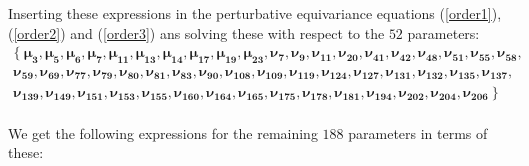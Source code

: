 \documentclass[a4paper,12pt, DIV=14, BCOR=5mm, twoside, headsepline, numbers=noenddot]{scrbook}
\begin{document}
\vspace{1cm}

Inserting these expressions in the perturbative equivariance equations (\ref{order1}), (\ref{order2}) and (\ref{order3}) ans solving these with respect to the $52$ parameters:\\

\begin{multline}\label{AreaParas}
\bigl\{ \ 
\boldsymbol{\mu_{3}},\boldsymbol{\mu_{5}},\boldsymbol{\mu_{6}},\boldsymbol{\mu_{7}},\boldsymbol{\mu_{11}},\boldsymbol{\mu_{13}},\boldsymbol{\mu_{14}},\boldsymbol{\mu_{17}},\boldsymbol{\mu_{19}},\boldsymbol{\mu_{23}},\boldsymbol{\nu_{7}},\boldsymbol{\nu_{9}},\boldsymbol{\nu_{11}},\boldsymbol{\nu_{20}},\boldsymbol{\nu_{41}},\boldsymbol{\nu_{42}},\boldsymbol{\nu_{48}},\boldsymbol{\nu_{51}},\boldsymbol{\nu_{55}},\boldsymbol{\nu_{58}},
\\
\boldsymbol{\nu_{59}},\boldsymbol{\nu_{69}},\boldsymbol{\nu_{77}},\boldsymbol{\nu_{79}},\boldsymbol{\nu_{80}},
\boldsymbol{\nu_{81}},\boldsymbol{\nu_{83}},\boldsymbol{\nu_{90}},\boldsymbol{\nu_{108}},\boldsymbol{\nu_{109}},\boldsymbol{\nu_{119}},\boldsymbol{\nu_{124}},\boldsymbol{\nu_{127}},\boldsymbol{\nu_{131}},\boldsymbol{\nu_{132}},\boldsymbol{\nu_{135}},\boldsymbol{\nu_{137}},
\\
\boldsymbol{\nu_{139}},\boldsymbol{\nu_{149}},\boldsymbol{\nu_{151}},\boldsymbol{\nu_{153}},\boldsymbol{\nu_{155}},\boldsymbol{\nu_{160}},\boldsymbol{\nu_{164}},\boldsymbol{\nu_{165}},\boldsymbol{\nu_{175}},\boldsymbol{\nu_{178}},\boldsymbol{\nu_{181}},\boldsymbol{\nu_{194}},\boldsymbol{\nu_{202}},\boldsymbol{\nu_{204}},\boldsymbol{\nu_{206}}
\ \bigr\}
\\
\end{multline}

We get the following expressions for the remaining $188$ parameters in terms of these:\\
\end{document}

